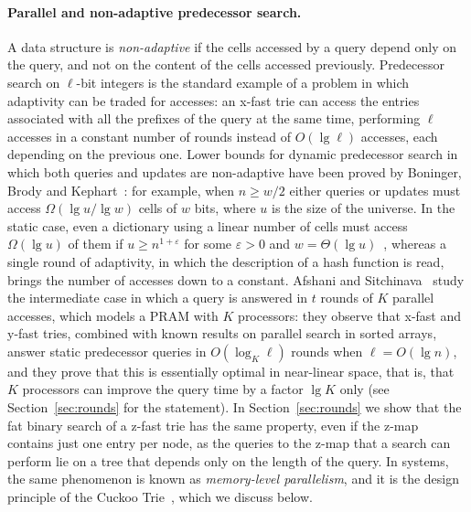 \documentclass[a4paper]{article}
\newcommand{\?}{\mskip1.5mu}
\renewcommand{\epsilon}{\varepsilon}
\begin{document}
\paragraph{Parallel and non-adaptive predecessor search.} A data structure is \emph{non-adaptive} if the cells accessed by a 
query depend only on the query, and not on the content of the cells accessed previously. Predecessor search on $\ell$-bit integers 
is the standard example of a problem in which adaptivity can be traded for accesses: an x-fast trie can access the entries associated with all the prefixes of the query 
at the same time, performing $\ell$ accesses in a constant number of rounds instead of $O(\lg\ell)$ accesses, each depending on the previous one. 
Lower bounds for dynamic predecessor search in which both queries and updates are non-adaptive 
have been proved by Boninger, Brody and Kephart~\cite{Boninger2017Nonadaptive}: for example, when $n\geq w/2$ either queries or updates must access 
$\Omega(\lg u/\lg w)$ cells of $w$ bits, where $u$ is the size of the universe. In the static case, even a dictionary using a linear number of cells
must access $\Omega(\lg u)$ of them if $u\geq n^{1+\epsilon}$ for some $\epsilon>0$ and $w=\Theta(\lg u)$~\cite{Larsen2024Optimal}, whereas 
a single round of adaptivity, in which the description of a hash function is read, brings the number of accesses down to a constant. 
Afshani and Sitchinava~\cite{Afshani2025Cell} study the intermediate case in which a query is answered in $t$ rounds of $K$ parallel accesses, 
which models a PRAM with $K$ processors: they observe that x-fast and y-fast tries, combined with known results on parallel search in sorted arrays, 
answer static predecessor queries in $O(\log_K\ell)$ rounds when $\ell=O(\lg n)$, and they prove that this is essentially optimal in near-linear space, 
that is, that $K$ processors can improve the query time by a factor $\lg K$ only (see Section~\ref{sec:rounds} for the statement). 
In Section~\ref{sec:rounds} we show that the fat binary search of a z-fast trie has the same property, even if the z-map contains just one entry per node, 
as the queries to the z-map that a search can perform lie on a tree that depends only on the length of the query. In systems, the same phenomenon is known as 
\emph{memory-level parallelism}, and it is the design principle of the Cuckoo Trie~\cite{Zeitak2021Cuckoo}, which we discuss below.
\end{document}
